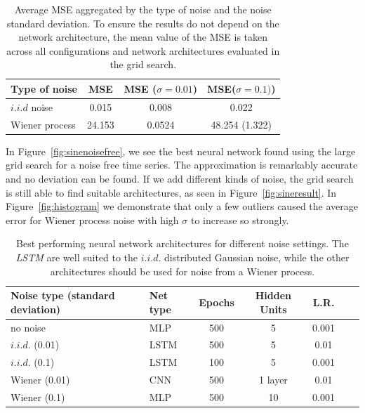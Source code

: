 \begin{table}
    \centering
    \begin{tabular}{l|ccc}
        Type of noise & MSE & MSE ($\sigma=0.01$) & MSE($\sigma=0.1)$) \\
        \hline
        $i.i.d$ noise &   0.015 & 0.008  &  0.022 \\
        Wiener process & 24.153 & 0.0524 & 48.254 (1.322) \\
    \end{tabular}
    \caption{Average MSE aggregated by the type of noise and the noise
        standard deviation. To ensure the results do not depend on the network 
        architecture, the mean value of the MSE is taken across all configurations
        and network architectures evaluated in the grid search.}
    \label{tab:wiener_iid}
\end{table}

In Figure~\ref{fig:sinenoisefree}, we see the best neural network found using 
the large grid search for a noise free time series. The approximation is 
remarkably accurate and no deviation can be found. If we add different kinds of 
noise, the grid search is still able to find suitable architectures, 
as seen in Figure~\ref{fig:sineresult}. In Figure~\ref{fig:histogram}
we demonstrate that only a few outliers caused the average error 
for Wiener process noise with high $\sigma$ to increase so strongly.

\begin{table}
    \begin{tabular}{l|lccccl}
        Noise type (standard deviation) & Net type & Epochs & Hidden Units & L.R.\\
        \hline
        no noise        & MLP   & 500 & 5   & 0.001 \\
        $i.i.d.$ (0.01) & LSTM  & 500 & 5   & 0.01 \\
        $i.i.d.$ (0.1)  & LSTM  & 100 & 5   & 0.001 \\
        Wiener (0.01)   & CNN   & 500 & 1 layer   & 0.01 \\
        Wiener (0.1)    & MLP   & 500 & 10  & 0.001 \\
    \end{tabular}
    \caption{Best performing neural network architectures for different noise 
    settings. The \emph{LSTM} are well suited to the $i.i.d.$ distributed 
    Gaussian noise, while the other architectures should be used for noise 
    from a Wiener process.}
    \label{tab:architectures}
\end{table}

